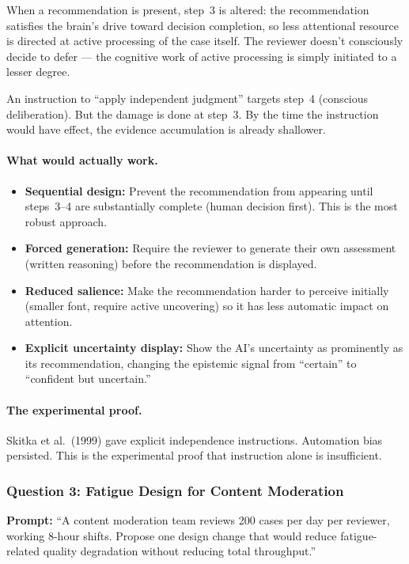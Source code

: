 When a recommendation is present, step~3 is altered: the recommendation satisfies the brain's drive toward decision completion, so less attentional resource is directed at active processing of the case itself. The reviewer doesn't consciously decide to defer --- the cognitive work of active processing is simply initiated to a lesser degree.

An instruction to ``apply independent judgment'' targets step~4 (conscious deliberation). But the damage is done at step~3. By the time the instruction would have effect, the evidence accumulation is already shallower.

\paragraph{What would actually work.}

\begin{itemize}
    \item \textbf{Sequential design:} Prevent the recommendation from appearing until steps~3--4 are substantially complete (human decision first). This is the most robust approach.
    \item \textbf{Forced generation:} Require the reviewer to generate their own assessment (written reasoning) before the recommendation is displayed.
    \item \textbf{Reduced salience:} Make the recommendation harder to perceive initially (smaller font, require active uncovering) so it has less automatic impact on attention.
    \item \textbf{Explicit uncertainty display:} Show the AI's uncertainty as prominently as its recommendation, changing the epistemic signal from ``certain'' to ``confident but uncertain.''
\end{itemize}

\paragraph{The experimental proof.} Skitka et al.\ (1999) gave explicit independence instructions. Automation bias persisted. This is the experimental proof that instruction alone is insufficient.

\subsubsection{Question 3: Fatigue Design for Content Moderation}

\textbf{Prompt:} ``A content moderation team reviews 200 cases per day per reviewer, working 8-hour shifts. Propose one design change that would reduce fatigue-related quality degradation without reducing total throughput.''

